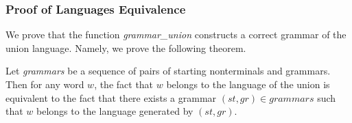 


\subsubsection{Proof of Languages Equivalence}

We prove that the function \textit{grammar\_union} constructs a correct grammar of the union language. Namely, we prove the following theorem.

\begin{theorem} \label{theorem-correct-union}
    Let \textit{grammars} be a sequence of pairs of starting nonterminals and grammars. Then for any word $w$, the fact that $w$ belongs to the language of the union is equivalent to the fact that there exists a grammar $(st,gr) \in \textit{grammars}$ such that $w$ belongs to the language generated by $(st,gr)$.
\end{theorem}





